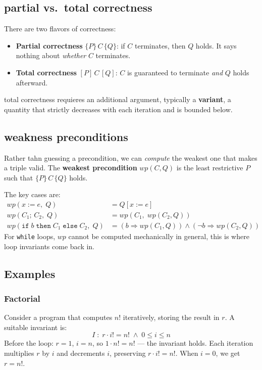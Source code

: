 \subsection{partial vs.\ total correctness}
There are two flavors of correctness:
\begin{itemize}
  \item \textbf{Partial correctness} $\{P\}\, C\, \{Q\}$: if $C$
  terminates, then $Q$ holds. It says nothing about \emph{whether}
  $C$ terminates.
  \item \textbf{Total correctness} $[P]\, C\, [Q]$: $C$ is guaranteed
  to terminate \emph{and} $Q$ holds afterward.
\end{itemize}

total correctness requieres an additional argument, typically a \textbf{variant}, a quantity that strictly decreases with each iteration and is bounded below.

\subsection{weakness preconditions}

Rather tahn guessing a precondition, we can \emph{compute} the weakest one that makes a triple valid. The \textbf{weakest precondition} $\mathit{wp}(C, Q)$ is the least restrictive $P$ such that $\{P\}\, C\, \{Q\}$ holds.

The key cases are:
\begin{align*}
  \mathit{wp}(x := e,\; Q) &= Q[x := e] \\
  \mathit{wp}(C_1;\, C_2,\; Q) &= \mathit{wp}(C_1,\;
  \mathit{wp}(C_2, Q)) \\
  \mathit{wp}(\texttt{if}\; b\; \texttt{then}\; C_1\;
  \texttt{else}\; C_2,\; Q)
    &= (b \Rightarrow \mathit{wp}(C_1, Q))
       \wedge (\neg b \Rightarrow \mathit{wp}(C_2, Q))
\end{align*}
For \texttt{while} loops, $\mathit{wp}$ cannot be computed
mechanically in general, this is where loop invariants come back in.

\subsection{Examples}

\subsubsection{Factorial}

Consider a program that computes $n!$ iteratively, storing the result
in $r$. A suitable invariant is:
\[
  I \;:\; r \cdot i! = n! \;\wedge\; 0 \leq i \leq n
\]
Before the loop: $r = 1$, $i = n$, so $1 \cdot n! = n!$ — the
invariant holds. Each iteration multiplies $r$ by $i$ and decrements
$i$, preserving $r \cdot i! = n!$. When $i = 0$, we get $r = n!$.


